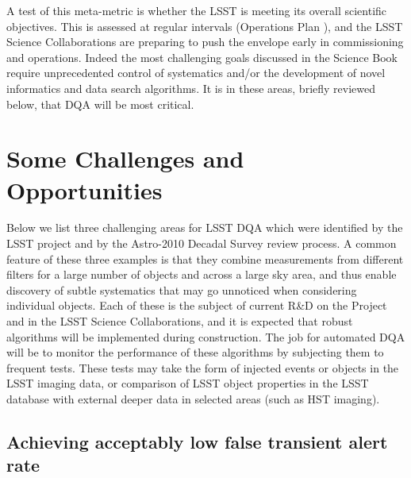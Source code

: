 \documentclass[SE,toc,lsstdraft]{lsstdoc}
\newcommand{\newtext}[1]{{\color{blue} #1}}
\begin{document}
A test of this meta-metric is whether the LSST is meeting its overall scientific objectives.  This is assessed at regular intervals (Operations Plan ), and the LSST Science Collaborations are preparing to push the envelope early in commissioning and operations. Indeed the most challenging goals discussed in the Science Book require unprecedented control of systematics and/or the development of novel informatics and data search algorithms. It is in these areas, briefly reviewed below,  that DQA will be most critical.



\section{Some Challenges and Opportunities}

Below we list three challenging areas for LSST DQA which were identified by the LSST project and by the Astro-2010 Decadal Survey review process. A common feature of these three examples is that they combine measurements from different filters for a large number of objects and across a large sky area, and thus enable discovery of subtle systematics that may go unnoticed when considering individual objects. Each of these is the subject of current R\&D on the Project \newtext{and in the LSST Science Collaborations}, and it is expected that robust algorithms will be implemented during construction.  The job for automated DQA will be to monitor the performance of these algorithms by subjecting them to frequent tests. These tests may take the form of injected events or objects in the LSST imaging data, or comparison of LSST object properties in the LSST database with external deeper data in selected areas (such as HST imaging).

\subsection{Achieving acceptably low false transient alert rate}
\end{document}
